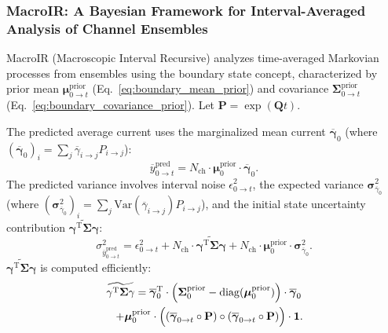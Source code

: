 \documentclass[pdflatex,sn-nature]{sn-jnl}%
\begin{document}
\subsubsection{MacroIR: A Bayesian Framework for Interval-Averaged Analysis of Channel Ensembles}
\label{sec:macroir}
MacroIR (Macroscopic Interval Recursive) analyzes time-averaged Markovian processes from ensembles \cite{Munch2022} using the boundary state concept, characterized by prior mean \(\boldsymbol{\mu}^{\text{prior}}_{0 \rightarrow t}\) (Eq.~\ref{eq:boundary_mean_prior}) and covariance \(\boldsymbol{\Sigma}^{\text{prior}}_{0 \rightarrow t}\) (Eq.~\ref{eq:boundary_covariance_prior}). Let \(\mathbf{P} = \exp(\boldsymbol{Q}t)\).

The predicted average current uses the marginalized mean current \(\overline{\boldsymbol{\gamma}}_{0}\) (where \((\overline{\boldsymbol{\gamma}}_{0})_i = \sum_j \overline{\gamma}_{i \rightarrow j} P_{i\rightarrow j}\)): %
\begin{equation}
    \overline{y}^{\text{pred}}_{0 \rightarrow t} = N_{\text{ch}} \cdot \boldsymbol{\mu}^{\text{prior}}_{0} \cdot \overline{\boldsymbol{\gamma}}_{0}.
    \label{eq:macro_interval_predicted_y} %
\end{equation}
The predicted variance involves interval noise \(\epsilon^2_{0 \rightarrow t}\), the expected variance \(\boldsymbol{\sigma}^2_{\overline{\gamma}_{0}}\) (where \((\boldsymbol{\sigma}^2_{\overline{\gamma}_{0}})_i = \sum_j \mathrm{Var}(\overline{\gamma}_{i\rightarrow j}) P_{i\rightarrow j}\)), %
and the initial state uncertainty contribution \( \widetilde{\mathbf{\gamma}^{\mathrm{T}} \mathbf{\Sigma}\mathbf{\gamma}}\):
\begin{equation}
    \sigma^2_{\overline{y}^{\text{pred}}_{0 \rightarrow t}} = \epsilon^2_{0 \rightarrow t} + N_{\text{ch}} \cdot \widetilde{\mathbf{\gamma}^{\mathrm{T}} \mathbf{\Sigma}\mathbf{\gamma}} + N_{\text{ch}} \cdot \boldsymbol{\mu}^{\text{prior}}_{0} \cdot \boldsymbol{\sigma}^2_{\overline{\gamma}_{0}}.
    \label{eq:macro_interval_sigma_pred} %
\end{equation}
\( \widetilde{\mathbf{\gamma}^{\mathrm{T}} \mathbf{\Sigma}\mathbf{\gamma}} \) is computed efficiently:
\begin{multline}
    \widetilde{\mathbf{\gamma}^{\mathrm{T}} \mathbf{\Sigma}\mathbf{\gamma}} = %
    \overline{\boldsymbol{\gamma}}_{0}^{\mathrm{T}} \cdot \Bigl( \boldsymbol{\Sigma}^{\text{prior}}_{0} - \mathrm{diag}(\boldsymbol{\mu}^{\text{prior}}_0) \Bigr) \cdot \overline{\boldsymbol{\gamma}}_{0} \\
    \quad + \boldsymbol{\mu}^{\text{prior}}_0 \cdot \Bigl( (\overline{\boldsymbol{\gamma}}_{0 \rightarrow t} \circ \mathbf{P}) \circ (\overline{\boldsymbol{\gamma}}_{0 \rightarrow t} \circ \mathbf{P}) \Bigr) \cdot \mathbf{1}.
    \label{eq:simplified_boundary_state} %
\end{multline}
\end{document}
